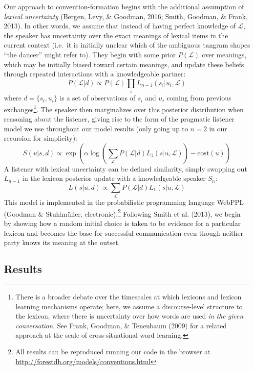 \documentclass[10pt, letterpaper]{article}
\begin{document}
Our approach to convention-formation begins with the additional
assumption of \emph{lexical uncertainty} (Bergen, Levy, \& Goodman,
2016; Smith, Goodman, \& Frank, 2013). In other words, we assume that
instead of having perfect knowledge of \(\mathcal{L}\), the speaker has
uncertainty over the exact meanings of lexical items in the current
context (i.e.~it is initially unclear which of the ambiguous tangram
shapes ``the dancer'' might refer to). They begin with some prior
\(P(\mathcal{L})\) over meanings, which may be initially biased toward
certain meanings, and update these beliefs through repeated interactions
with a knowledgeable partner:
\[P(\mathcal{L} | d) \propto P(\mathcal{L})\prod_i L_{n-1}(s_i|u_i, \mathcal{L})\]
where \(d = \{s_i, u_i\}\) is a set of observations of \(s_i\) and
\(u_i\) coming from previous exchanges\footnote{There is a broader
  debate over the timescales at which lexicons and lexicon learning
  mechanisms operate; here, we assume a discourse-level structure to the
  lexicon, where there is uncertainty over how words are used \emph{in
  the given conversation}. See Frank, Goodman, \& Tenenbaum (2009) for a
  related approach at the scale of cross-situational word learning.}.
The speaker then marginalizes over this posterior distribution when
reasoning about the listener, giving rise to the form of the pragmatic
listener model we use throughout our model results (only going up to
\(n = 2\) in our recursion for simplicity):
\[S(u | s, d) \propto \exp( \alpha\log\left(\sum_{\mathcal{L}} P(\mathcal{L} | d) L_1(s | u, \mathcal{L})\right) - \textrm{cost}(u) )\]
\indent A listener with lexical uncertainty can be defined similarity,
simply swapping out \(L_{n-1}\) in the lexicon posterior update with a
knowledgeable speaker \(S_{n}\):
\[L(s | u, d) \propto \sum_\mathcal{L}P(\mathcal{L}|d)L_1(s|u,\mathcal{L})\]
\indent This model is implemented in the probabilistic programming
language WebPPL (Goodman \& Stuhlmüller, electronic).\footnote{All
  results can be reproduced running our code in the browser at
  \url{http://forestdb.org/models/conventions.html}} Following Smith et
al. (2013), we begin by showing how a random initial choice is taken to
be evidence for a particular lexicon and becomes the base for successful
communication even though neither party knows its meaning at the outset.

\subsection{Results}\label{results-1}
\end{document}
